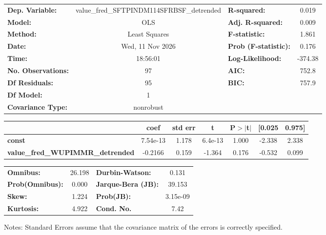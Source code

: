 \begin{center}
\begin{tabular}{lclc}
\toprule
\textbf{Dep. Variable:}                  & value\_fred\_SFTPINDM114SFRBSF\_detrended & \textbf{  R-squared:         } &     0.019   \\
\textbf{Model:}                          &                    OLS                    & \textbf{  Adj. R-squared:    } &     0.009   \\
\textbf{Method:}                         &               Least Squares               & \textbf{  F-statistic:       } &     1.861   \\
\textbf{Date:}                           &              Wed, 11 Nov 2026             & \textbf{  Prob (F-statistic):} &    0.176    \\
\textbf{Time:}                           &                  18:56:01                 & \textbf{  Log-Likelihood:    } &   -374.38   \\
\textbf{No. Observations:}               &                       97                  & \textbf{  AIC:               } &     752.8   \\
\textbf{Df Residuals:}                   &                       95                  & \textbf{  BIC:               } &     757.9   \\
\textbf{Df Model:}                       &                        1                  & \textbf{                     } &             \\
\textbf{Covariance Type:}                &                 nonrobust                 & \textbf{                     } &             \\
\bottomrule
\end{tabular}
\begin{tabular}{lcccccc}
                                         & \textbf{coef} & \textbf{std err} & \textbf{t} & \textbf{P$> |$t$|$} & \textbf{[0.025} & \textbf{0.975]}  \\
\midrule
\textbf{const}                           &     7.54e-13  &        1.178     &   6.4e-13  &         1.000        &       -2.338    &        2.338     \\
\textbf{value\_fred\_WUPIMMR\_detrended} &      -0.2166  &        0.159     &    -1.364  &         0.176        &       -0.532    &        0.099     \\
\bottomrule
\end{tabular}
\begin{tabular}{lclc}
\textbf{Omnibus:}       & 26.198 & \textbf{  Durbin-Watson:     } &    0.131  \\
\textbf{Prob(Omnibus):} &  0.000 & \textbf{  Jarque-Bera (JB):  } &   39.153  \\
\textbf{Skew:}          &  1.224 & \textbf{  Prob(JB):          } & 3.15e-09  \\
\textbf{Kurtosis:}      &  4.922 & \textbf{  Cond. No.          } &     7.42  \\
\bottomrule
\end{tabular}
\end{center}

Notes: \newline
 [1] Standard Errors assume that the covariance matrix of the errors is correctly specified.